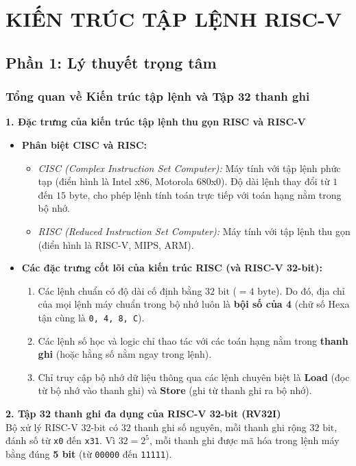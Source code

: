 \chapter{KIẾN TRÚC TẬP LỆNH RISC-V}

\section{Phần 1: Lý thuyết trọng tâm}

\subsection{Tổng quan về Kiến trúc tập lệnh và Tập 32 thanh ghi}

\textbf{1. Đặc trưng của kiến trúc tập lệnh thu gọn RISC và RISC-V}
\begin{itemize}
    \item \textbf{Phân biệt CISC và RISC:}
    \begin{itemize}
        \item \textit{CISC (Complex Instruction Set Computer):} Máy tính với tập lệnh phức tạp (điển hình là Intel x86, Motorola 680x0). Độ dài lệnh thay đổi từ $1$ đến $15\text{ byte}$, cho phép lệnh tính toán trực tiếp với toán hạng nằm trong bộ nhớ.
        \item \textit{RISC (Reduced Instruction Set Computer):} Máy tính với tập lệnh thu gọn (điển hình là RISC-V, MIPS, ARM).
    \end{itemize}
    \item \textbf{Các đặc trưng cốt lõi của kiến trúc RISC (và RISC-V 32-bit):}
    \begin{enumerate}
        \item Các lệnh chuẩn có độ dài cố định bằng $32\text{ bit}$ ($= 4\text{ byte}$). Do đó, địa chỉ của mọi lệnh máy chuẩn trong bộ nhớ luôn là \textbf{bội số của 4} (chữ số Hexa tận cùng là \texttt{0, 4, 8, C}).
        \item Các lệnh số học và logic chỉ thao tác với các toán hạng nằm trong \textbf{thanh ghi} (hoặc hằng số nằm ngay trong lệnh).
        \item Chỉ truy cập bộ nhớ dữ liệu thông qua các lệnh chuyên biệt là \textbf{Load} (đọc từ bộ nhớ vào thanh ghi) và \textbf{Store} (ghi từ thanh ghi ra bộ nhớ).
    \end{enumerate}
\end{itemize}

\textbf{2. Tập 32 thanh ghi đa dụng của RISC-V 32-bit (RV32I)}\\
Bộ xử lý RISC-V 32-bit có $32$ thanh ghi số nguyên, mỗi thanh ghi rộng $32\text{ bit}$, đánh số từ \texttt{x0} đến \texttt{x31}. Vì $32 = 2^5$, mỗi thanh ghi được mã hóa trong lệnh máy bằng đúng \textbf{5 bit} (từ \texttt{00000} đến \texttt{11111}).

